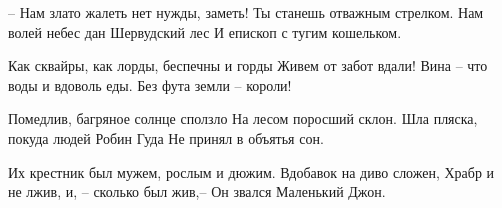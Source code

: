\begin{flushleft}
\newpage

– Нам злато жалеть нет нужды, заметь! \linebreak
Ты станешь отважным стрелком. \linebreak
Нам волей небес дан Шервудский лес \linebreak
И епископ с тугим кошельком. \linebreak

Как сквайры, как лорды, беспечны и горды \linebreak
Живем от забот вдали! \linebreak
Вина – что воды и вдоволь еды. \linebreak
Без фута земли – короли! \linebreak

Помедлив, багряное солнце сползло \linebreak
На лесом поросший склон. \linebreak
Шла пляска, покуда людей Робин Гуда \linebreak
Не принял в объятья сон. \linebreak

Их крестник был мужем, рослым и дюжим. \linebreak
Вдобавок на диво сложен, \linebreak
Храбр и не лжив, и, – сколько был жив,– \linebreak
Он звался Маленький Джон. \linebreak

\end{flushleft}
